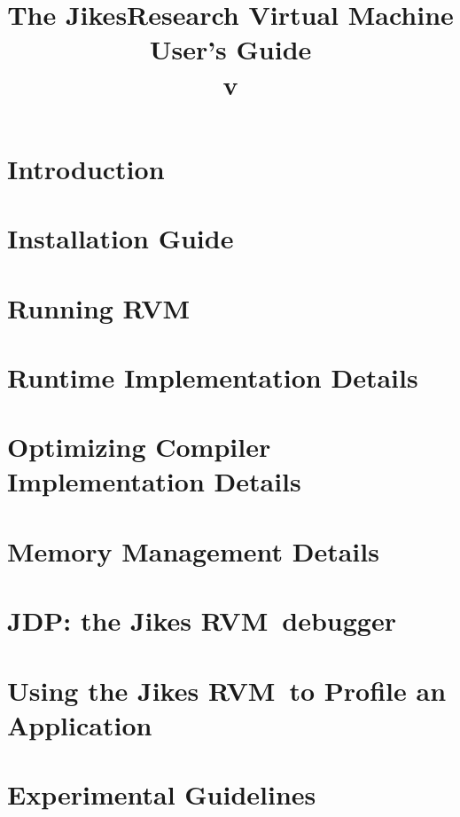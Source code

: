 \documentclass{article}
\title{\texonly{\vfill} {\huge The Jikes\trademark Research Virtual
Machine
\\
User's Guide} \\ {\huge v\version} \\ { } \texonly{\vfill}}
\newcommand{\jrvm}{Jikes RVM}
\begin{document}
\maketitle
\date{}

\T \newpage
\label{hlxtoc}
\T \tableofcontents
\T \listoffigures
\W {}

\T \newpage
\section{Introduction}


\T \newpage
{}
\section{Installation Guide} \label{section:installation}


\T \newpage
\section{Running RVM} \label{section:running}


\T \newpage
\section{Runtime Implementation Details}


\T \newpage
\section{Optimizing Compiler Implementation Details}
\label{section:optdetails}


\T \newpage
\section{Memory Management Details}


\T \newpage
\section{JDP: the \jrvm\ debugger}


\T \newpage
\section{Using the \jrvm\ to Profile an Application}


\T \newpage
\section{Experimental Guidelines}

\end{document}
